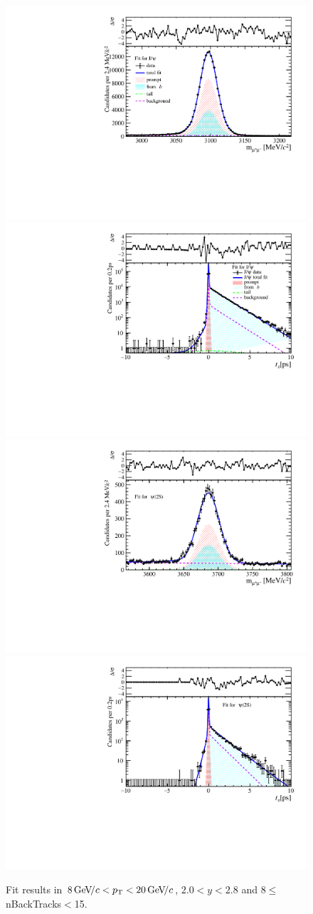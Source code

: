 \begin{figure}[H]
\begin{center}
\includegraphics[width=0.47\linewidth]{pdf/Jpsi/drawmassB/n2y1pt5.pdf}
\includegraphics[width=0.47\linewidth]{pdf/Jpsi/2DFitB/n2y1pt5.pdf}
\vspace*{-0.5cm}
\includegraphics[width=0.47\linewidth]{pdf/Psi2S/drawmassB/n2y1pt5.pdf}
\includegraphics[width=0.47\linewidth]{pdf/Psi2S/2DFitB/n2y1pt5.pdf}
\vspace*{-0.5cm}
\end{center}
\caption{Fit results in $8\text{\,Ge\kern -0.1em V\!/}c<p_{\mathrm{T}}<20\text{\,Ge\kern -0.1em V\!/}c$, $2.0<y<2.8$ and 8$\leq$nBackTracks$<$15.}
\label{Fitn2y1pt5}
\end{figure}
